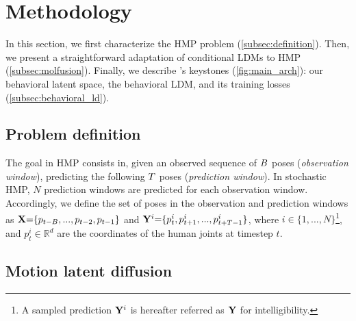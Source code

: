 \documentclass[10pt,twocolumn,letterpaper]{article}
\begin{document}
\def\encoder{\mathcal{E}}
\def\decoder{\mathcal{D}}
\def\ldFunction{f_{\Phi}}
\def\latcode{z}
\def\diffused{\latcode_{t}}
\def\diffusedPrev{\latcode_{t-1}}
\def\diffusedStart{\latcode_{0}}

\def\extPred{\pred_{e}}
\def\bvaeEncParams{\theta}
\def\bvaeDecParams{\phi}
\def\bvaeAuxDecParams{\omega}
\def\bvaeXmotionEncParams{\alpha}
\def\bvaeXmotionEnc{g_{\bvaeXmotionEncParams}}
\def\vaeObsEncParams{\lambda}
\def\vaeObsEnc{h_{\vaeObsEncParams}}
\def\bvaeDec{\mathcal{B}_{\bvaeDecParams}}
\def\bvaeEnc{p_{\bvaeEncParams}}
\def\bvaeAuxDec{\mathcal{A}_{\bvaeAuxDecParams}}

\def\lossrec{\mathcal{L}_{rec}}
\def\losslat{\mathcal{L}_{lat}}





\section{Methodology}
\label{sec:methodology}

In this section, we first characterize the HMP problem (\autoref{subsec:definition}). 
Then, we present a straightforward adaptation of conditional LDMs to HMP (\autoref{subsec:molfusion}). Finally, we describe \modelname{}'s keystones (\autoref{fig:main_arch}): our behavioral latent space, the behavioral LDM, and its training losses (\autoref{subsec:behavioral_ld}). 

\subsection{Problem definition}
\label{subsec:definition}

The goal in HMP consists in, given an observed sequence of $B$ poses (\textit{observation window}), predicting the following $T$ poses (\textit{prediction window}). In stochastic HMP, $N$ prediction windows are predicted for each observation window.
Accordingly, we define the set of poses in the observation and prediction windows as $\mathbf{X}{=}\{p_{t-B}, {...}, p_{t-2}, p_{t-1}\}$ and $\mathbf{Y}^{i}{=}\{p_{t}^{i}, p_{t+1}^{i}, {...}, p_{t+T-1}^{i}\}$, where $i{\in} \{1, {...}, N\}$\footnote{A sampled prediction $\mathbf{Y}^{i}$ is hereafter referred as $\mathbf{Y}$ for intelligibility. }, and $p_t^{i} {\in} \mathbb{R}^d$ are the coordinates of the human joints at timestep $t$.

\subsection{Motion latent diffusion}
\label{subsec:molfusion}
\end{document}
